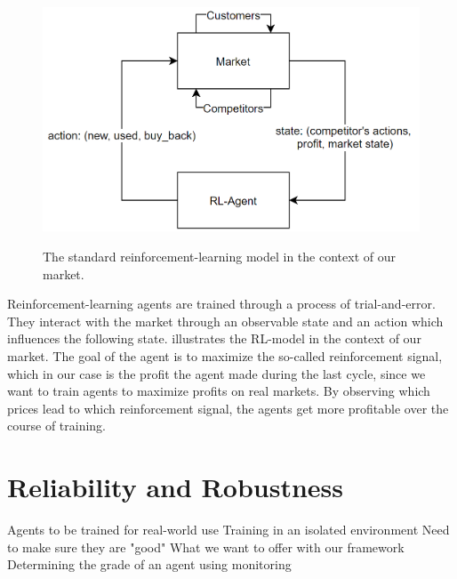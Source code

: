 \begin{figure}
	\centering
	\includegraphics[height = 7 cm]{graphics/RL-Overview.png}\\[1 ex]
	\caption{The standard reinforcement-learning model in the context of our market.}
	\label{fig:IntroRLDiagram}
\end{figure}

Reinforcement-learning agents are trained through a process of trial-and-error. They interact with the market through an observable state
and an action which influences the following state.  illustrates the RL-model in the context of our 
market. The goal of the agent is to maximize the so-called reinforcement signal, 
which in our case is the profit the agent made during the last cycle, since we want to train agents to maximize profits on real markets.
By observing which prices lead to which reinforcement signal, the agents get more profitable over the course of training.


\section{Reliability and Robustness}


Agents to be trained for real-world use
Training in an isolated environment
Need to make sure they are "good"
What we want to offer with our framework
Determining the grade of an agent using monitoring